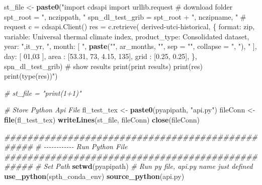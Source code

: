 \documentclass[
]{book}
\newenvironment{Shaded}{\begin{snugshade}}{\end{snugshade}}
\newcommand{\CommentTok}[1]{\textcolor[rgb]{0.56,0.35,0.01}{\textit{#1}}}
\newcommand{\DataTypeTok}[1]{\textcolor[rgb]{0.13,0.29,0.53}{#1}}
\newcommand{\KeywordTok}[1]{\textcolor[rgb]{0.13,0.29,0.53}{\textbf{#1}}}
\newcommand{\NormalTok}[1]{#1}
\newcommand{\StringTok}[1]{\textcolor[rgb]{0.31,0.60,0.02}{#1}}
\begin{document}
\begin{Shaded}
\begin{Highlighting}[]
\NormalTok{    st\_file \textless{}{-}}\StringTok{ }\KeywordTok{paste0}\NormalTok{(}\StringTok{"import cdsapi}
\StringTok{import urllib.request}
\StringTok{\# download folder}
\StringTok{spt\_root = \textquotesingle{}"}\NormalTok{, nczippath, }\StringTok{"\textquotesingle{}}
\StringTok{spn\_dl\_test\_grib = spt\_root + \textquotesingle{}"}\NormalTok{, nczipname, }\StringTok{"\textquotesingle{}}
\StringTok{\# request}
\StringTok{c = cdsapi.Client()}
\StringTok{res = c.retrieve(}
\StringTok{    \textquotesingle{}derived{-}utci{-}historical\textquotesingle{},}
\StringTok{    \{}
\StringTok{        \textquotesingle{}format\textquotesingle{}: \textquotesingle{}zip\textquotesingle{},}
\StringTok{        \textquotesingle{}variable\textquotesingle{}: \textquotesingle{}Universal thermal climate index\textquotesingle{},}
\StringTok{        \textquotesingle{}product\_type\textquotesingle{}: \textquotesingle{}Consolidated dataset\textquotesingle{},}
\StringTok{        \textquotesingle{}year\textquotesingle{}: \textquotesingle{}"}\NormalTok{,it\_yr, }\StringTok{"\textquotesingle{},}
\StringTok{        \textquotesingle{}month\textquotesingle{}: [}
\StringTok{            "}\NormalTok{, }\KeywordTok{paste}\NormalTok{(}\StringTok{"\textquotesingle{}"}\NormalTok{, ar\_months, }\StringTok{"\textquotesingle{}"}\NormalTok{, }\DataTypeTok{sep =} \StringTok{""}\NormalTok{, }\DataTypeTok{collapse =} \StringTok{", "}\NormalTok{), }\StringTok{"}
\StringTok{        ],}
\StringTok{        \textquotesingle{}day\textquotesingle{}: [}
\StringTok{            \textquotesingle{}01\textquotesingle{},\textquotesingle{}03\textquotesingle{}}
\StringTok{        ],}
\StringTok{        \textquotesingle{}area\textquotesingle{}  : [53.31, 73, 4.15, 135],}
\StringTok{        \textquotesingle{}grid\textquotesingle{}  : [0.25, 0.25],}
\StringTok{    \},}
\StringTok{    spn\_dl\_test\_grib)}
\StringTok{\# show results}
\StringTok{print(\textquotesingle{}print results\textquotesingle{})}
\StringTok{print(res)}
\StringTok{print(type(res))"}\NormalTok{)}

    \CommentTok{\# st\_file = "print(1+1)"}

    \CommentTok{\# Store Python Api File}
\NormalTok{    fl\_test\_tex \textless{}{-}}\StringTok{ }\KeywordTok{paste0}\NormalTok{(pyapipath, }\StringTok{"api.py"}\NormalTok{)}
\NormalTok{    fileConn \textless{}{-}}\StringTok{ }\KeywordTok{file}\NormalTok{(fl\_test\_tex)}
    \KeywordTok{writeLines}\NormalTok{(st\_file, fileConn)}
    \KeywordTok{close}\NormalTok{(fileConn)}

    \CommentTok{\#\#\#\#\#\#\#\#\#\#\#\#\#\#\#\#\#\#\#\#\#\#\#\#\#\#\#\#\#\#\#\#\#\#\#\#\#\#\#\#\#\#\#\#\#\#\#\#\#}
    \CommentTok{\# {-}{-}{-}{-}{-}{-}{-}{-}{-}{-}{-}{-} Run Python File}
    \CommentTok{\#\#\#\#\#\#\#\#\#\#\#\#\#\#\#\#\#\#\#\#\#\#\#\#\#\#\#\#\#\#\#\#\#\#\#\#\#\#\#\#\#\#\#\#\#\#\#\#\#}
    \CommentTok{\# Set Path}
    \KeywordTok{setwd}\NormalTok{(pyapipath)}
    \CommentTok{\# Run py file, api.py name just defined}
    \KeywordTok{use\_python}\NormalTok{(spth\_conda\_env)}
    \KeywordTok{source\_python}\NormalTok{(}\StringTok{\textquotesingle{}api.py\textquotesingle{}}\NormalTok{)}


\end{Highlighting}
\end{Shaded}
\end{document}
